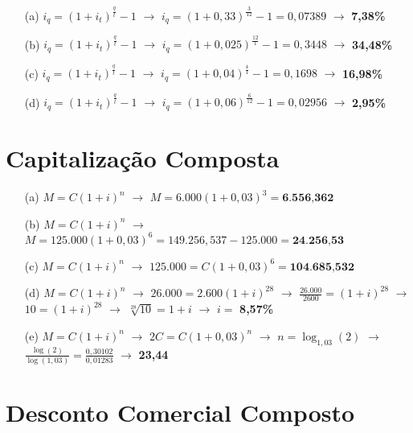 \documentclass[report]{uftex}
\begin{document}
\begin{itemize}
	\item[(a)] $i_q = (1+i_t)^\frac{q}{t} -1$ $\rightarrow$ $i_q = (1+0,33)^\frac{3}{12} -1 = 0,07389$ $\rightarrow$ \textbf{7,38\%}
	
	\item[(b)] $i_q = (1+i_t)^\frac{q}{t} -1$ $\rightarrow$ $i_q = (1+0,025)^\frac{12}{1} -1 = 0,3448$ $\rightarrow$ \textbf{34,48\%}
	
	\item[(c)] $i_q = (1+i_t)^\frac{q}{t} -1$ $\rightarrow$ $i_q = (1+0,04)^\frac{4}{1} -1 = 0,1698$ $\rightarrow$  \textbf{16,98\%}
	
	\item[(d)] $i_q = (1+i_t)^\frac{q}{t} -1$ $\rightarrow$ $i_q = (1+0,06)^\frac{6}{12} -1 = 0,02956$ $\rightarrow$ \textbf{2,95\%}
\end{itemize}

\section{Capitalização Composta}

\begin{itemize}
	\item[(a)] $M = C(1+i)^n$ $\rightarrow$ $M = 6.000(1+0,03)^3 = \textbf{6.556,362}$
	
	\item[(b)] $M = C(1+i)^n$ $\rightarrow$ $M = 125.000(1+0,03)^6 = 149.256,537 - 125.000 = \textbf{24.256,53}$
	
	\item[(c)] $M = C(1+i)^n$ $\rightarrow$ $125.000 = C(1+0,03)^6 = \textbf{104.685,532}$
	
	\item[(d)] $M = C(1+i)^n$ $\rightarrow$ $26.000 = 2.600(1+i)^{28}$ $\rightarrow$ $\frac{26.000}{2600} = (1+i)^{28}$ $\rightarrow$ $10 = (1+i)^{28}$ $\rightarrow$  $\sqrt[28]{10} = 1 + i$ $\rightarrow$ $i =$ \textbf{8,57\%}
	
	\item[(e)] $M = C(1+i)^n$ $\rightarrow$ $2C = C(1+0,03)^n$ $\rightarrow$ $n = \log_{1,03}(2)$ $\rightarrow$ $\frac{\log(2)}{\log(1,03)} = \frac{0,30102}{0,01283}$ $\rightarrow$ \textbf{23,44}
\end{itemize}

\section{Desconto Comercial Composto}
\end{document}

